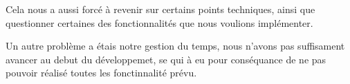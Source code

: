 \documentclass[12pt]{report}
\begin{document}
Cela nous a aussi forcé à revenir sur certains points techniques,
ainsi que questionner certaines des fonctionnalités que nous voulions
implémenter.

Un autre problème a étais notre gestion du temps, nous n'avons pas
suffisament avancer au debut du développemet, se qui à eu pour
conséquance de ne pas pouvoir réalisé toutes les fonctinnalité prévu.
\end{document}
